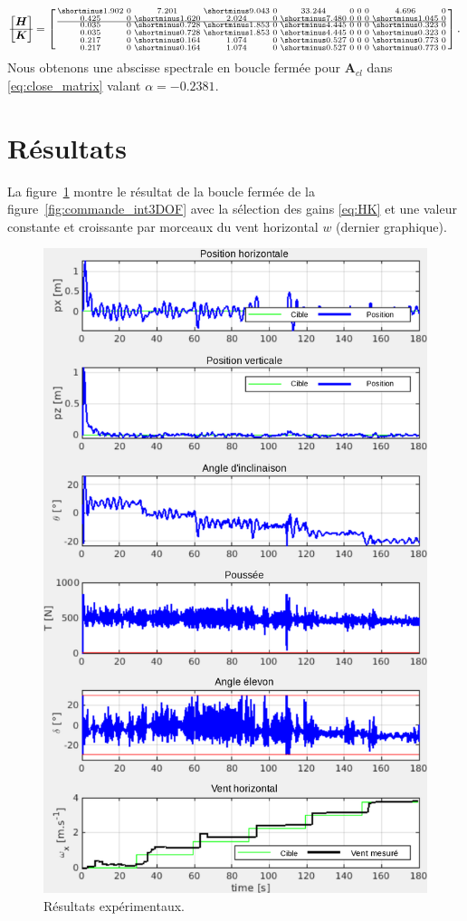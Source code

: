 \begin{align}\label{eq:HK}
\begin{bmatrix}
    \boldsymbol{H}\\ \hline \boldsymbol{K }
\end{bmatrix} = \smallmat{
\shortminus1.902 & 0 & 7.201 & \shortminus9.043  & 0 & 33.244 & 0 & 0 & 0 & 4.696  & 0 \\ 
0.425 & 0 & \shortminus1.620 & 2.024  & 0 & \shortminus7.480 & 0 & 0 & 0 & \shortminus1.045  & 0 \\  \hline
0.035 & 0 & \shortminus0.728 & \shortminus1.853  & 0 & \shortminus4.445 & 0 & 0 & 0 & \shortminus0.323  & 0 \\ 
0.035 & 0 & \shortminus0.728 & \shortminus1.853  & 0 & \shortminus4.445 & 0 & 0 & 0 & \shortminus0.323  & 0 \\ 
0.217  & 0 & \shortminus0.164  & 1.074 & 0 & \shortminus0.527 & 0 & 0 & 0 & \shortminus0.773 & 0 \\ 
0.217  & 0 & \shortminus0.164  & 1.074 & 0 & \shortminus0.527 & 0 & 0 & 0 & \shortminus0.773 & 0  
}.
\end{align}
Nous obtenons une abscisse spectrale en boucle fermée pour $\boldsymbol{A}_{cl}$ dans \eqref{eq:close_matrix} valant $\alpha = -0.2381$.

\section{Résultats}
\label{sec:exp3DOF}
La figure~\ref{fig_exp_centrage_arr} montre le résultat de la boucle fermée de la figure~\ref{fig:commande_int3DOF} avec la sélection des gains \eqref{eq:HK} et une valeur constante et croissante par morceaux du vent horizontal $w$ (dernier graphique). 

\begin{figure}[ht!]
    \centering
     \includegraphics[width=0.6\columnwidth]{figures/exp.png}
     \caption{Résultats expérimentaux.}
     \label{fig_exp_centrage_arr}
 \end{figure}

